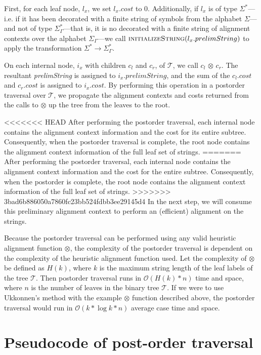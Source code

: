 \documentclass[11pt]{article}
\begin{document}
First, for each leaf node, $l_x$, we set $l_x.cost$ to $0$.
Additionally, if $l_x$ is of type $\Sigma^{*}$---i.e. if it has been decorated with a finite string of symbols from the alphabet $\Sigma$---and not of type $\Sigma^{*}_{\Gamma}$---that is, it is no decorated with a finite string of alignment contexts over the alphabet $\Sigma_{\Gamma}$---we call $\Call{initializeString}{l_x.prelimString}$ to apply the transformation $\Sigma^{*} \rightarrow \Sigma^{*}_{\Gamma}$.

On each internal node, $i_x$ with children $c_l$ and $c_r$, of $\mathcal{T}$, we call $c_l$ $\otimes$ $c_r$.
The resultant \textit{prelimString} is assigned to $i_x.prelimString$, and the sum of the $c_l.cost$ and $c_r.cost$ is assigned to $i_x.cost$.
By performing this operation in a postorder traversal over $\mathcal{T}$, we propagate the alignment contexts and costs returned from the calls to $\otimes$ up the tree from the leaves to the root.

<<<<<<< HEAD
After performing the postorder traversal, each internal node contains the alignment context information and the cost for its entire subtree.
Consequently, when the postorder traversal is complete, the root node contains the alignment context information of the full leaf set of strings.
=======
After performing the postorder traversal, each internal node contains the alignment context information and the cost for the entire subtree.
Consequently, when the postorder is complete, the root node contains the alignment context information of the full leaf set of strings.
>>>>>>> 3bad6b886050a7860fc23bb524fdbb3ee29145d4
In the next step, we will consume this preliminary alignment context to perform an (efficient) alignment on the strings.

Because the postorder traversal can be performed using any valid heuristic alignment function $\otimes$, the complexity of the postorder traversal is dependent on the complexity of the heuristic alignment function used.
Let the complexity of $\otimes$ be defined as $H(k)$, where $k$ is the maximum string length of the leaf labels of the tree $\mathcal{T}$.
Then postorder traversal runs in $\mathcal{O}(H(k) * n)$ time and space, where $n$ is the number of leaves in the binary tree $\mathcal{T}$.
If we were to use Ukkonnen's method with the example $\otimes$ function described above, the postorder traversal would run in $\mathcal{O}(k * \log  k * n)$ average case time and space.

\section{Pseudocode of post-order traversal}
\end{document}
